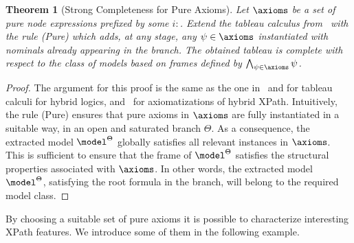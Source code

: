 \documentclass[10pt,a4paper]{amsart}
\newtheorem{thm}{Theorem}[section]
\theoremstyle{definition}
\theoremstyle{remark}
\begin{document}
\begin{thm}[Strong Completeness for Pure Axioms]\label{th:strong}
    \label{th:pure-completeness}
    Let $\axioms$ be a set of pure node expressions prefixed by some $i{:}$.
    Extend the tableau calculus from~ with the rule (Pure) which adds, at any stage, any $\psi\in\axioms$ instantiated with nominals already appearing in the branch. The obtained tableau is complete with respect to the class of models based on frames defined by $\bigwedge_{\psi\in\axioms} \psi$.
\end{thm}

\begin{proof}
 The argument for this proof is the same as the one in~\cite[Th.~7.2]{Blackburn00} and \cite[Prop.~3.2]{Blackburn2002BeyondPA} for tableau calculi for hybrid logics, and~\cite[Th.~3.23]{ArecesF21} for axiomatizations of hybrid XPath.  Intuitively, the rule (Pure) ensures that pure axioms in $\axioms$ are fully instantiated in a suitable way, in an open and saturated branch $\Theta$. As a consequence, the extracted model $\model^\Theta$ globally satisfies all relevant instances in $\axioms$. This is sufficient to ensure that the frame of $\model^\Theta$ satisfies the structural properties associated with $\axioms$. In 
 other words, the extracted model $\model^\Theta$, satisfying the root formula in the branch, will belong to the required model class. 
\end{proof}

By choosing a suitable set of pure axioms it is possible to characterize interesting XPath features. 
We introduce some of them in the following example.
\end{document}
